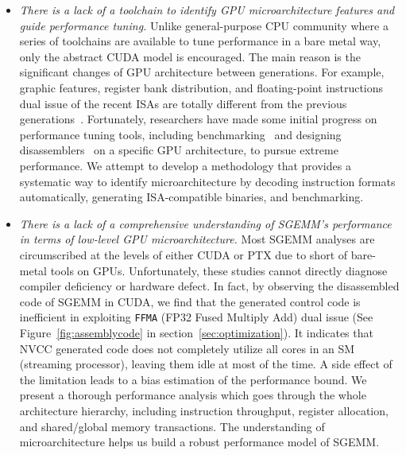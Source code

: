 \begin{itemize}
\item {\em There is a lack of a toolchain to identify GPU microarchitecture features and guide performance tuning.}
    Unlike general-purpose CPU community where a series of toolchains are available to tune performance in a bare metal
        way, only the abstract CUDA model is encouraged. The main reason is the significant changes of GPU architecture
        between generations. For example, graphic features, register bank distribution, and floating-point 
instructions dual
        issue of the recent ISAs are totally different from the previous generations~\cite{fermi}. Fortunately, researchers have made
        some initial progress on performance tuning tools, including benchmarking~\cite{mei, volkov, wong} and designing disassemblers~\cite{asfermi,bernstein2012usable,decuda,maxas} on a 
specific GPU architecture, to pursue extreme performance. We attempt to develop a methodology that provides a systematic way to identify 
microarchitecture by decoding instruction formats automatically, generating ISA-compatible binaries, and benchmarking.
\item {\em There is a lack of a comprehensive understanding of SGEMM's performance in terms of low-level GPU 
microarchitecture.} Most SGEMM analyses are circumscribed at the levels of either CUDA or PTX due to short of 
bare-metal tools on GPUs. Unfortunately, these studies cannot directly diagnose compiler deficiency or hardware 
defect. In fact, by observing the disassembled code of SGEMM in CUDA, we find that the generated control code is  
inefficient in exploiting {\tt FFMA} (FP32 Fused Multiply Add) dual issue (See Figure~\ref{fig:assemblycode} in section~\ref{sec:optimization}). 
It indicates that NVCC generated code does not 
completely utilize all cores in an SM (streaming processor), leaving 
them idle at most of the time. 
A side effect of the limitation leads to a bias estimation of the performance bound. We 
present a thorough performance analysis which goes through the whole architecture hierarchy, including instruction 
throughput, register allocation, and shared/global memory transactions. The understanding of microarchitecture helps us 
build a robust performance model of SGEMM.
\end{itemize}

